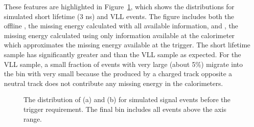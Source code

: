 These features are highlighted in Figure~\ref{fig:trigger_met}, which shows the \met distributions for simulated short lifetime (3 ns) and \ac{VLL} \rhadron events.
The figure includes both the offline \met, the missing energy calculated with all available information, and \calomet, the missing energy calculated using only information available at the calorimeter which approximates the missing energy available at the trigger.
The short lifetime sample has significantly greater \met and \calomet than the \ac{VLL} sample as expected.
For the \ac{VLL} sample, a small fraction of events with very large \met (about 5\%) migrate into the bin with very small \calomet because the \met produced by a charged \rhadron track opposite a neutral \rhadron track does not contribute any missing energy in the calorimeters.

\begin{figure}[h]
\centering
{}
\caption{The distribution of (a) \met and (b) \calomet for simulated signal events before the trigger requirement. The final bin includes all events above the axis range.}
\label{fig:trigger_met}
\end{figure}

